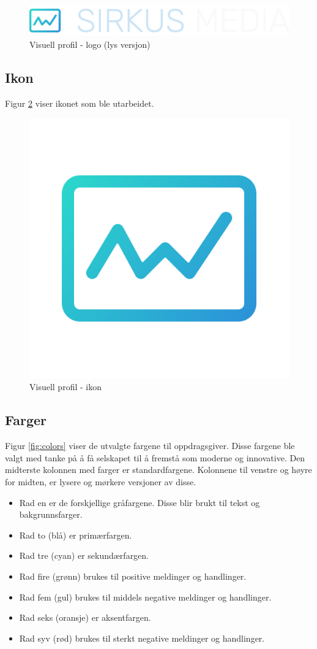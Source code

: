 \begin{figure}[H]
    \centering
    \includegraphics[width=.5\textwidth]{design/logo-light.png}
    \caption{Visuell profil - logo (lys versjon)}
    \label{fig:logo-light}
\end{figure}

\subsection{Ikon}
Figur \ref{fig:icon} viser ikonet som ble utarbeidet.

\begin{figure}[H]
    \centering
    \includegraphics[width=.25\textwidth]{design/logo-icon.png}
    \caption{Visuell profil - ikon}
    \label{fig:icon}
\end{figure}

\subsection{Farger}
Figur \ref{fig:colors} viser de utvalgte fargene til oppdragsgiver. Disse fargene ble valgt med tanke på å få selskapet til å fremstå som moderne og innovative.
Den midterste kolonnen med farger er standardfargene. Kolonnene til venstre og høyre for midten, er lysere og mørkere versjoner av disse.
\begin{itemize}
    \item Rad en er de forskjellige gråfargene. Disse blir brukt til tekst og bakgrunnsfarger.
    \item Rad to (blå) er primærfargen.
    \item Rad tre (cyan) er sekundærfargen.
    \item Rad fire (grønn) brukes til positive meldinger og handlinger.
    \item Rad fem (gul) brukes til middels negative meldinger og handlinger.
    \item Rad seks (oransje) er aksentfargen.
    \item Rad syv (rød) brukes til sterkt negative meldinger og handlinger.
\end{itemize}

